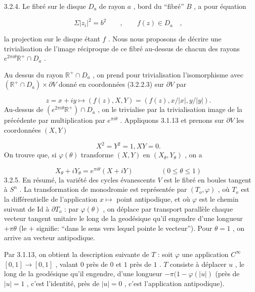 3.2.4. Le fibré sur le disque $D_a$ de rayon $a$ , bord du ``fibré'' $B$ , a pour équation

\begin{equation*}
\Sigma |z_i|^2 = b^2 \qquad , \qquad f(z) \in D_a \quad , 
\end{equation*}


 la projection sur le disque étant $f$ . Nous nous proposons de décrire une trivialisation de l'image réciproque de ce fibré au-dessus de chacun des rayons $e^{2\pi i \theta} \mathbb{R}^+ \cap D_a$ .

Au dessus du rayon $\mathbb{R}^+ \cap D_a$ , on prend pour trivialisation l'isomorphisme avec $(\mathbb{R}^+ \cap D_a) \times \partial V$ donné en coordonnées (3.2.2.3) sur $\partial V$ par

\begin{equation*}
z = x+iy \longmapsto (f(z), X, Y) = (f(z), x/|x|, y/|y|) .
\end{equation*}
Au-dessus de $(e^{2\pi i \theta} \mathbb{R}^+) \cap D_a$ , on le trivialise par la trivialisation image de la précédente par multiplication par $e^{\pi i \theta}$ . Appliquons 3.1.13 et prenons sur $\partial V$ les coordonnées $(X, Y)$

\begin{equation}\tag{3.2.4.1}
X^2 = Y^2 = 1, XY = 0 .
\end{equation}
On trouve que, si $\varphi(\theta)$ transforme $(X, Y)$ en $(X_\theta, Y_\theta)$ , on a

\begin{equation}\tag{3.2.4.2}
X_\theta + i Y_\theta = e^{\pi i \theta}(X + i Y) \qquad\qquad (0 \leq \theta \leq 1)
\end{equation}
3.2.5. En résumé, la variété des cycles évanescents $V$ est le fibré en boules tangent à $S^n$ . La transformation de monodromie est représentée par $(T_o, \varphi)$ , où $T_o$ est la différentielle de l'application $x \longmapsto$ point antipodique, et où $\varphi$ est le chemin suivant de $\mathrm{Id}$ à $\partial T_o$ : par $\varphi(\theta)$ , on déplace par transport parallèle chaque vecteur tangent unitaire le long de la geodésique qu'il engendre d'une longueur $+ \pi \theta$ (le $+$ signifie: ``dans le sens vers lequel pointe le vecteur''). Pour $\theta = 1$ , on arrive au vecteur antipodique.

Par 3.1.13, on obtient la description suivante de $T$ : soit $\varphi$ une application $C^\infty$ $[0,1] \to [0,1]$ , valant $0$ près de $0$ et $1$ près de $1$ . $T$ consiste à déplacer $u$ , le long de la geodésique qu'il engendre, d'une longueur $- \pi(1-\varphi(|u|)$ (près de $|u| = 1$ , c'est l'identité, près de $|u| = 0$ , c'est l'application antipodique).


